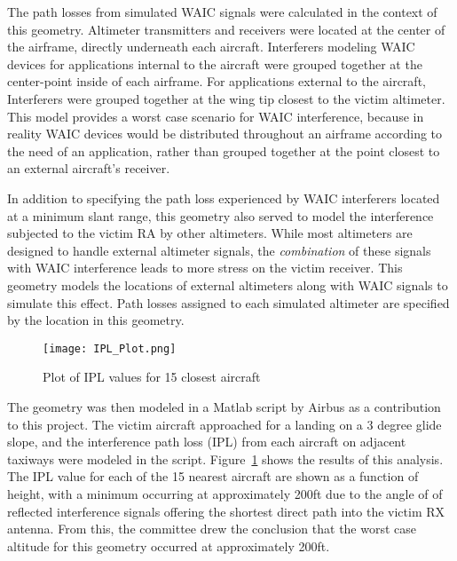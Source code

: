 The path losses from simulated WAIC signals were calculated in the context of this geometry. Altimeter transmitters and receivers were located at the center of the airframe, directly underneath each aircraft. Interferers modeling WAIC devices for applications internal to the aircraft were grouped together at the center-point inside of each airframe. For applications external to the aircraft, Interferers were grouped together at the wing tip closest to the victim altimeter. This model provides a worst case scenario for WAIC interference, because in reality WAIC devices would be distributed throughout an airframe according to the need of an application, rather than grouped together at the point closest to an external aircraft's receiver. 
%	

In addition to specifying the path loss experienced by WAIC interferers located at a minimum slant range, this geometry also served to model the interference subjected to the victim RA by other altimeters. While most altimeters are designed to handle external altimeter signals, the \textit{combination} of these signals with WAIC interference leads to more stress on the victim receiver. This geometry models the locations of external altimeters along with WAIC signals to simulate this effect. Path losses assigned to each simulated altimeter are specified by the location in this geometry. 

\begin{figure}[ht]
\centering
\texttt{[image: IPL\_Plot.png]}
\caption{Plot of IPL values for 15 closest aircraft}

\label{fig:IPL}

\end{figure}

The geometry was then modeled in a Matlab script by Airbus as a contribution to this project. The victim aircraft approached for  a landing on a 3 degree glide slope, and the interference path loss (IPL) from each aircraft on adjacent taxiways were modeled  in the script. Figure~\ref{fig:IPL} shows the results of this analysis. The IPL value for each of the 15 nearest aircraft are shown as a function of height, with a minimum occurring at approximately 200ft due to the angle of of reflected interference signals offering the shortest direct path into the victim RX antenna. From this, the committee drew the conclusion that the worst case altitude for this geometry occurred at approximately 200ft. 

